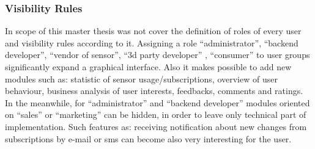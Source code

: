 		\subsubsection {Visibility Rules}
		In scope of this master thesis was not cover the definition of roles of every user and visibility rules according to it. Assigning a role ``administrator'', ``backend developer'', ``vendor of sensor'', ``3d party developer'' , ``consumer'' to user groups significantly expand a graphical interface. Also it makes possible to add new modules such as: statistic of sensor usage/subscriptions, overview of user behaviour, business analysis of user interests, feedbacks, comments and ratings. In the meanwhile, for ``administrator'' and ``backend developer'' modules oriented on ``sales'' or ``marketing'' can be hidden, in order to leave only technical part of implementation. Such features as: receiving notification about new changes from subscriptions by e-mail or sms can become also very interesting for the user.
